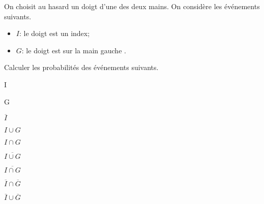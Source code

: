  \begin{exercice}
 On choisit au hasard un doigt d'une des deux mains. On considère les événements suivants. 
 \begin{itemize}
  \item $I$: \og le doigt est un index\fg ;
  \item $G$: \og le doigt est sur la main gauche \fg.
 \end{itemize}
 Calculer les probabilités des événements suivants.
 \begin{colenumerate}{2}
 \item I
 \item G
 \item $\overline{I}$
 \item $I\cup G$
 \item $I\cap G$
 \item $\overline{I\cup G}$
 \item $\overline{I\cap G}$ 
 \item $\overline{I}\cap \overline{G}$
 \item  $\overline{I}\cup \overline{G}$
 \end{colenumerate}
\end{exercice}
%             
%     
%         
%         
%             
